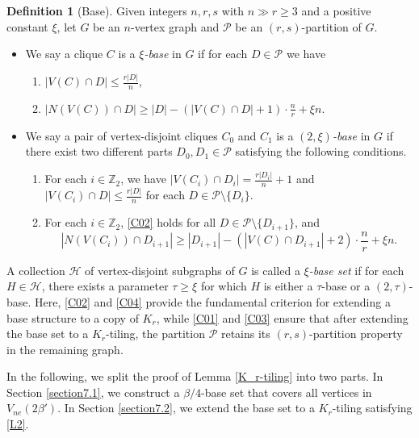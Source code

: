 \documentclass[11pt, a4paper]{article}
\theoremstyle{definition}
\newtheorem{definition}[theorem]{Definition}
\newcommand{\<}{\subseteq}
\begin{document}
\begin{definition}[Base]\label{Base}
Given integers $n,r,s$  with $n\gg r\ge 3$ and a positive constant $\xi$, let $G$ be an $n$-vertex graph and $\mathcal{P}$ be an $(r,s)$-partition of $G$. 
\begin{itemize}
    \item We say a clique $C$ is a \textit{$\xi$-base} in $G$ if for each  $D\in\mathcal{P}$ we have 
\begin{enumerate}
[label =\rm  (D\arabic{enumi})]
    \item\label{C01} $|V(C)\cap D|\le \frac{r|D|}{n}$,
    \item\label{C02}  $|N(V(C))\cap D|\ge |D|-(|V(C)\cap D|+1)\cdot \frac{n}{r} +\xi n$.
\end{enumerate}

\item We say a pair of vertex-disjoint cliques $C_0$ and $C_1$ is a \textit{$(2,\xi)$-base} in $G$ if there exist two  different parts $D_0, D_1\in \mathcal{P}$ satisfying the following conditions.
\begin{enumerate}
[label =\rm  (D\arabic{enumi})]
\addtocounter{enumi}{2}
    \item\label{C03} For each $i\in\mathbb{Z}_2$, we have $|V(C_i)\cap D_i|=\frac{r|D_i|}{n}+1$ and  $|V(C_i)\cap D|\le \frac{r|D|}{n}$ for each $D\in \mathcal{P}\setminus\{D_{i}\}$.
    \item\label{C04} For each $i\in \mathbb{Z}_2$, \ref{C02} holds for all $D\in \mathcal{P}\setminus \{D_{i+1}\}$, and 
    $$|N(V(C_i))\cap D_{i+1}|\ge |D_{i+1}|-(|V(C)\cap D_{i+1}|+2)\cdot \frac{n}{r}+\xi n.$$
\end{enumerate}
\end{itemize}
\end{definition}

A collection $\mathcal{H}$ of vertex-disjoint subgraphs of $G$ is called a \textit{$\xi$-base set} if for each $H \in \mathcal{H}$, there exists a parameter $\tau \geq \xi$ for which $H$ is either a $\tau$-base or a $(2, \tau)$-base. %
Here, \ref{C02} and \ref{C04} provide the fundamental criterion for extending a base structure to a copy of $K_r$, while \ref{C01} and \ref{C03} ensure that after extending the base set to a $K_r$-tiling, the partition $\mathcal{P}$ retains its $(r,s)$-partition property in the remaining graph.


In the following, we split the proof of Lemma \ref{K_r-tiling} into two parts. In Section \ref{section7.1}, we construct a $\beta/4$-base set that covers all vertices in $V_{ne}(2\beta')$. In Section \ref{section7.2}, we extend the base set to a $K_r$-tiling satisfying \ref{L2}. %
\end{document}

